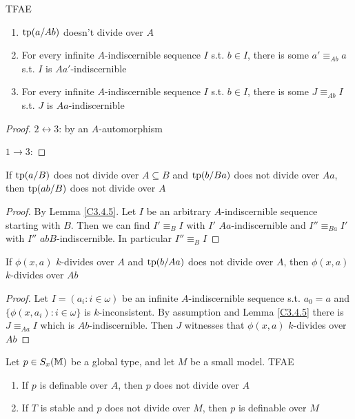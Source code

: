 \documentclass[11pt]{article}
\begin{document}
\begin{lemma}[]
\label{C3.4.5}
TFAE
\begin{enumerate}
\item \(\operatorname{tp}(a/Ab)\) doesn't divide over \(A\)
\item For every infinite \(A\)-indiscernible sequence \(I\) s.t. \(b\in I\), there is
some \(a'\equiv_{Ab}a\) s.t. \(I\) is \(Aa'\)-indiscernible
\item For every infinite \(A\)-indiscernible sequence \(I\) s.t. \(b\in I\), there is
some \(J\equiv_{Ab}I\) s.t. \(J\) is \(Aa\)-indiscernible
\end{enumerate}
\end{lemma}

\begin{proof}
\(2\leftrightarrow 3\): by an \(A\)-automorphism

\(1\to 3\):
\end{proof}

\begin{corollary}[]
If \(\operatorname{tp}(a/B)\) does not divide over \(A\subseteq B\) and \(\operatorname{tp}(b/Ba)\) does not divide over \(Aa\),
then \(\operatorname{tp}(ab/B)\) does not divide over \(A\)
\end{corollary}

\begin{proof}
By Lemma \ref{C3.4.5}. Let \(I\) be an arbitrary \(A\)-indiscernible sequence starting with \(B\).
Then we can find \(I'\equiv_BI\) with \(I'\) \(Aa\)-indiscernible and \(I''\equiv_{Ba}I'\)
with \(I''\) \(abB\)-indiscernible. In particular \(I''\equiv_BI\)
\end{proof}

\begin{corollary}[]
If \(\phi(x,a)\) \(k\)-divides over \(A\) and \(\operatorname{tp}(b/Aa)\) does not divide over \(A\),
then \(\phi(x,a)\) \(k\)-divides over \(Ab\)
\end{corollary}

\begin{proof}
Let \(I=(a_i:i\in\omega)\) be an infinite \(A\)-indiscernible sequence s.t. \(a_0=a\)
and \(\{\phi(x,a_i):i\in\omega\}\) is \(k\)-inconsistent. By assumption and Lemma \ref{C3.4.5} there
is \(J\equiv_{Aa}I\) which is \(Ab\)-indiscernible. Then \(J\) witnesses
that \(\phi(x,a)\) \(k\)-divides over \(Ab\)
\end{proof}

\begin{proposition}[]
Let \(p\in S_x(\mathbb{M})\) be a global type, and let \(M\) be a small model. TFAE
\begin{enumerate}
\item If \(p\) is definable over \(A\), then \(p\) does not divide over \(A\)
\item If \(T\) is stable and \(p\) does not divide over \(M\), then \(p\) is definable over \(M\)
\end{enumerate}
\end{proposition}
\end{document}
